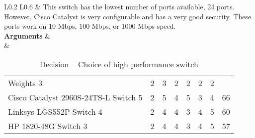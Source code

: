 \begin{table}[H]
\begin{tabular}{L{0.2\textwidth} L{0.6\textwidth}}
		& This switch has the lowest number of ports available, 24 ports. However, Cisco Catalyst is very configurable and has a very good security. These ports work on 10 Mbps, 100 Mbps, or 1000 Mbps speed. \\
		\midrule
		\textbf{Arguments}      & \\
		&   \begin{tabular}{l|llllll|l}
		                                      & \rot{Reliability} & \rot{Performance} & \rot{Interoperability} & \rot{Security} & \rot{Scalability} & \rot{Cost} & \rot{\textbf{Score}} \\ \hline
		Weights                             3 & 2 & 3 & 2 & 2 & 2 & 2 \\ \hline
		Cisco Catalyst 2960S-24TS-L Switch  5 & 2                 & 5                 & 4                      & 5              & 3                 & 4          & 66                   \\ 
		Linksys LGS552P Switch              4 & 2                 & 4                 & 4                      & 3              & 4                 & 5          & 60                   \\
		HP 1820-48G Switch                  3 & 2                 & 4                 & 4                      & 3              & 4                 & 5          & 57                   \\
	\end{tabular} \\
	\\ \bottomrule
	\end{tabular}
	\caption{Decision -- Choice of high performance switch}
	\label{table:switch-selection}
\end{table}